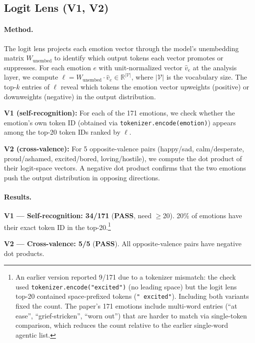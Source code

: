 \documentclass[11pt,a4paper]{article}
\newcommand{\pass}{\textcolor{passgreen}{\textbf{PASS}}}
\begin{document}
\subsection{Logit Lens (V1, V2)}

\paragraph{Method.}
The logit lens projects each emotion vector through the model's
unembedding matrix $W_{\text{unembed}}$ to identify which output tokens
each vector promotes or suppresses.  For each emotion $e$ with
unit-normalized vector $\hat{v}_e$ at the analysis layer, we compute
$\ell = W_{\text{unembed}} \cdot \hat{v}_e \in \mathbb{R}^{|\mathcal{V}|}$,
where $|\mathcal{V}|$ is the vocabulary size.  The top-$k$ entries of
$\ell$ reveal which tokens the emotion vector upweights (positive) or
downweights (negative) in the output distribution.

\textbf{V1 (self-recognition):} For each of the 171 emotions, we check
whether the emotion's own token ID (obtained via
\texttt{tokenizer.encode(emotion)}) appears among the top-20 token IDs
ranked by $\ell$.

\textbf{V2 (cross-valence):} For 5 opposite-valence pairs
(happy/sad, calm/desperate, proud/ashamed, excited/bored,
loving/hostile), we compute the dot product of their logit-space
vectors.  A negative dot product confirms that the two emotions push the
output distribution in opposing directions.

\paragraph{Results.}
\textbf{V1 --- Self-recognition: 34/171} (\pass, need $\geq$20).
20\% of emotions have their exact token ID in the top-20.\footnote{An
earlier version reported 9/171 due to a tokenizer mismatch: the check
used \texttt{tokenizer.encode("excited")} (no leading space) but the
logit lens top-20 contained space-prefixed tokens
(\texttt{" excited"}).  Including both variants fixed the count.
The paper's 171 emotions include multi-word entries (``at ease'',
``grief-stricken'', ``worn out'') that are harder to match via
single-token comparison, which reduces the count relative to the
earlier single-word agentic list.}

\textbf{V2 --- Cross-valence: 5/5} (\pass).
All opposite-valence pairs have negative dot products.
\end{document}
